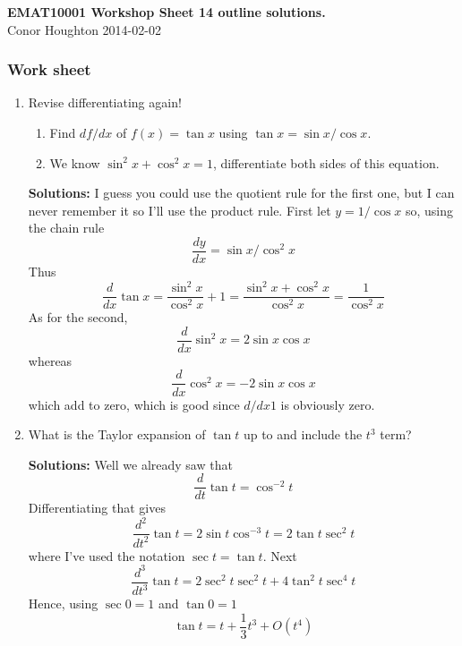 \documentclass[12pt]{article}
\begin{document}
\begin{center}
{\bf EMAT10001 Workshop Sheet 14 outline solutions.}\\[1cm]{} Conor Houghton 2014-02-02
\end{center}

\subsubsection*{Work sheet}

\begin{enumerate}


\item Revise differentiating  again!
\begin{enumerate}
\item Find $df/dx$ of $f(x)=\tan{x}$ using $\tan{x}=\sin{x}/\cos{x}$.
\item We know $\sin^2{x}+\cos^2{x}=1$, differentiate both sides of this equation.
\end{enumerate}

\textbf{Solutions: } I guess you could use the quotient rule for the
first one, but I can never remember it so I'll use the product
rule. First let $y=1/\cos{x}$ so, using the chain rule
\begin{equation}
\frac{dy}{dx}=\sin{x}/\cos^2{x}
\end{equation}
Thus
\begin{equation}
\frac{d}{dx}\tan{x}=\frac{\sin^2{x}}{\cos^2{x}}+1=\frac{\sin^2{x}+\cos^2{x}}{\cos^2x}=\frac{1}{\cos^2x}
\end{equation}
As for the second, 
\begin{equation}
\frac{d}{dx}\sin^2{x}=2\sin{x}\cos{x}
\end{equation}
whereas 
\begin{equation}
\frac{d}{dx}\cos^2{x}=-2\sin{x}\cos{x}
\end{equation}
which add to zero, which is good since $d/dx 1$ is obviously zero.

\item What is the Taylor expansion of $\tan{t}$ up to and include the $t^3$ term?

\textbf{Solutions: } Well we already saw that 
\begin{equation}
\frac{d}{dt}\tan{t}=\cos^{-2}t
\end{equation}
Differentiating that gives
\begin{equation}
\frac{d^2}{dt^2}\tan{t}=2\sin{t}\cos^{-3}t=2\tan{t}\sec^2{t}
\end{equation}
where I've used the notation $\sec{t}=\tan{t}$. Next
\begin{equation}
\frac{d^3}{dt^3}\tan{t}=2\sec^2{t}\sec^2{t}+4\tan^2{t}\sec^4{t}
\end{equation}
Hence, using $\sec{0}=1$ and $\tan{0}=1$
\begin{equation}
\tan{t}=t+\frac{1}{3}t^3+O(t^4)
\end{equation}



\end{enumerate}
\end{document}
